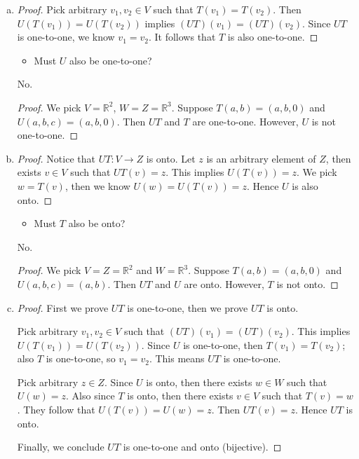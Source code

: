 \begin{Exercise}
\begin{enumerate}[(a)]
\item
\begin{proof}
Pick arbitrary $v_1, v_2\in V$ such that $T(v_1) = T(v_2)$. Then $U(T(v_1)) = U(T(v_2))$ implies $(UT)(v_1) = (UT)(v_2)$. Since $UT$ is one-to-one, we know $v_1 = v_2$. It follows that $T$ is also one-to-one.
\end{proof}
\begin{itemize}
\item Must $U$ also be one-to-one?
\end{itemize}
\begin{answer}
No.
\end{answer}
\begin{proof}
We pick $V = \mathbb{R}^2$, $W = Z = \mathbb{R}^3$. Suppose $T(a,b) = (a,b,0)$ and $U(a,b,c) = (a,b,0)$. Then $UT$ and $T$ are one-to-one. However, $U$ is not one-to-one.
\end{proof}

\item
\begin{proof}
Notice that $UT:V\to Z$ is onto. Let $z$ is an arbitrary element of $Z$, then exists $v\in V$ such that $UT(v) = z$. This implies $U(T(v)) = z$. We pick $w = T(v)$, then we know $U(w) = U(T(v)) = z$. Hence $U$ is also onto.
\end{proof}
\begin{itemize}
\item Must $T$ also be onto?
\end{itemize}
\begin{answer}
No.
\end{answer}
\begin{proof}
We pick $V=Z=\mathbb{R}^2$ and $W=\mathbb{R}^3$. Suppose $T(a,b) = (a,b,0)$ and $U(a,b,c) = (a,b)$. Then $UT$ and $U$ are onto. However, $T$ is not onto.
\end{proof}

\item
\begin{proof}
First we prove $UT$ is one-to-one, then we prove $UT$ is onto.

Pick arbitrary $v_1,v_2\in V$ such that $(UT)(v_1) = (UT)(v_2)$. This implies $U(T(v_1)) = U(T(v_2))$. Since $U$ is one-to-one, then $T(v_1) = T(v_2)$; also $T$ is one-to-one, so $v_1 = v_2$. This means $UT$ is one-to-one.

Pick arbitrary $z\in Z$. Since $U$ is onto, then there exists $w\in W$ such that $U(w) = z$. Also since $T$ is onto, then there exists $v\in V$ such that $T(v) = w$. They follow that $U(T(v)) = U(w) = z$. Then $UT(v) = z$. Hence $UT$ is onto.

Finally, we conclude $UT$ is one-to-one and onto (bijective).
\end{proof}
\end{enumerate}
\end{Exercise}